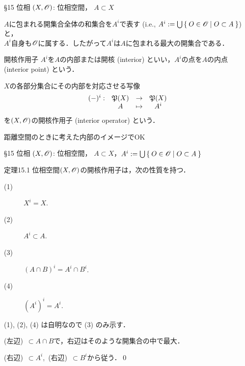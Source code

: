 \documentclass[uplatex,a4paper,dvipdfmx,aspectratio=169,11pt]{beamer}
\begin{document}
\begin{frame}[fragile]{\S 15 位相}
    $(X, \mathscr{O})$: 位相空間， \quad $A \subset X$

    \medskip{}

    $A$に包まれる開集合全体の和集合を$A^i$で表す (i.e., $A^i := \bigcup \Set{O \in \mathscr{O}| O \subset A}$) と，\\
    $A^i$自身も$\mathscr{O}$に属する．したがって$A^i$は$A$に包まれる最大の開集合である．

    \begin{block}{開核作用子}
        $A^i$を$A$の\alert{内部}または\alert{開核} (interior) といい，$A^i$の点を$A$の\alert{内点} (interior point) という．

        $X$の各部分集合にその内部を対応させる写像
        \begin{equation*} 
            \begin{array}{rccc}
                (-)^i: & \mathord{\mathfrak{P}}\qty(X) & \to & \mathord{\mathfrak{P}}\qty(X) \\
                       & A & \mapsto & A^i
            \end{array}
        \end{equation*}
        を$(X, \mathscr{O})$の\alert{開核作用子} (interior operator) という．
    \end{block}

    \medskip{}

    距離空間のときに考えた内部のイメージでOK

\end{frame}

\begin{frame}[fragile]{\S 15 位相}
    $(X, \mathscr{O})$: 位相空間， \quad $A \subset X$，\quad $A^i := \bigcup \Set{O \in \mathscr{O}| O \subset A}$

    \medskip{}

    \begin{block}{定理15.1}
        位相空間$(X, \mathscr{O})$の開核作用子は，次の性質を持つ．
        \begin{description}
            \item[(1)] $X^i = X$.
            \item[(2)] $A^i \subset A$.
            \item[(3)] $(A \cap B)^i = A^i \cap B^i$.
            \item[(4)] $(A^i)^i = A^i$.
        \end{description}
    \end{block}

    \medskip{}

     \quad (1), (2), (4) は自明なので (3) のみ示す．

    \begin{description}
        \item[$A^i \cap B^i \subset (A \cap B)^i$:] (左辺)\ $\subset A \cap B$で，右辺はそのような開集合の中で最大．
        \item[$(A \cap B)^i \subset A^i \cap B^i$:] (右辺)\ $\subset A^i$,\ (右辺)\ $\subset B^i$から従う．\qed
    \end{description}

\end{frame}
\end{document}
